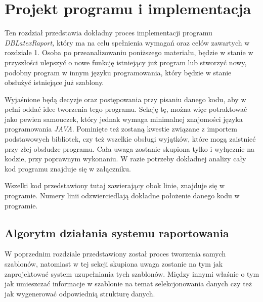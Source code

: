\chapter{Projekt programu i implementacja}



Ten rozdział przedstawia dokładny proces implementacji programu \emph{DBLatexRaport,}  który ma na celu spełnienia wymagań oraz celów zawartych w rozdziale 1.  Osoba po przeanalizowaniu poniższego materiału, będzie w stanie w przyszłości ulepszyć o nowe funkcję istniejący już program lub stworzyć nowy, podobny program w innym języku programowania, który będzie w stanie obsłużyć istniejące już szablony. 
\par
 Wyjaśnione będą decyzje oraz postępowania przy pisaniu danego kodu, aby w pełni oddać idee tworzenia tego programu. Sekcję tę, można więc potraktować jako pewien samouczek, który jednak wymaga minimalnej znajomości języka programowania \emph{JAVA}. Pominięte też zostaną kwestie związane z importem podstawowych bibliotek, czy też wszelkie obsługi wyjątków, które mogą zaistnieć przy złej obsłudze programu. Cała uwaga zostanie skupiona tylko i wyłącznie na kodzie, przy poprawnym wykonaniu. W razie potrzeby dokładnej analizy cały kod programu znajduje się w załączniku.
 \par
 Wszelki kod przedstawiony tutaj zawierający obok linie, znajduje się w programie. Numery linii odzwierciedlają dokładne położenie danego kodu w programie.

\section{Algorytm działania systemu raportowania}

W poprzednim rozdziale przedstawiony został proces tworzenia samych szablonów, natomiast w tej sekcji skupiona uwaga zostanie na tym jak zaprojektować system uzupełniania tych szablonów. Między innymi właśnie o tym jak umieszczać informacje w szablonie na temat selekcjonowania danych czy też jak wygenerować odpowiednią strukturę danych.

